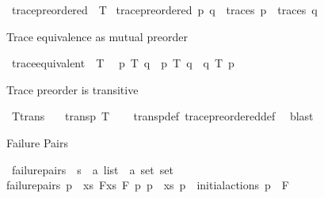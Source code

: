 \begin{isabellebody}
\begin{isamarkuptext}
\end{isamarkuptext}\isamarkuptrue%
\isamarkupfalse%
\ trace{\isacharunderscore}{\kern0pt}preordered\ {\isacharparenleft}{\kern0pt}\ {\isacartoucheopen}{\isasymlesssim}T{\isacartoucheclose}\ {}{}{\isacharparenright}{\kern0pt}\isanewline
{\isacartoucheopen}trace{\isacharunderscore}{\kern0pt}preordered\ p\ q\ {\isasymequiv}\ traces\ p\ {\isasymsubseteq}\ traces\ q{\isacartoucheclose}%
\begin{isamarkuptext}%
Trace equivalence as mutual preorder%
\end{isamarkuptext}\isamarkuptrue%
\isamarkupfalse%
\ trace{\isacharunderscore}{\kern0pt}equivalent\ {\isacharparenleft}{\kern0pt}\ {\isacartoucheopen}{\isasymsimeq}T{\isacartoucheclose}\ {}{}{\isacharparenright}{\kern0pt}\ \isanewline
{\isacartoucheopen}p\ {\isasymsimeq}T\ q\ {\isasymequiv}\ p\ {\isasymlesssim}T\ q\ {\isasymand}\ q\ {\isasymlesssim}T\ p{\isacartoucheclose}%
\begin{isamarkuptext}%
Trace preorder is transitive%
\end{isamarkuptext}\isamarkuptrue%
\isamarkupfalse%
\ T{\isacharunderscore}{\kern0pt}trans{\isacharcolon}{\kern0pt}\isanewline
\ \ \ {\isacartoucheopen}transp\ {\isacharparenleft}{\kern0pt}{\isasymlesssim}T{\isacharparenright}{\kern0pt}{\isacartoucheclose}\isanewline
%
\isadelimproof
\ \ %
\endisadelimproof
%
\isatagproof
{}\isamarkupfalse%
\ transp{\isacharunderscore}{\kern0pt}def\ trace{\isacharunderscore}{\kern0pt}preordered{\isacharunderscore}{\kern0pt}def\ \isamarkupfalse%
\ blast%
\endisatagproof
{\isafoldproof}%
%
\isadelimproof
%
\endisadelimproof
%
\begin{isamarkuptext}%
Failure Pairs%
\end{isamarkuptext}\isamarkuptrue%
\isamarkupfalse%
\ failure{\isacharunderscore}{\kern0pt}pairs\ {\isacharcolon}{\kern0pt}{\isacharcolon}{\kern0pt}\ {\isacartoucheopen}{\isacharprime}{\kern0pt}s\ {\isasymRightarrow}\ {\isacharparenleft}{\kern0pt}{\isacharprime}{\kern0pt}a\ list\ {\isasymtimes}\ {\isacharprime}{\kern0pt}a\ set{\isacharparenright}{\kern0pt}\ set{\isacartoucheclose}\isanewline
\ \ \isanewline
{\isacartoucheopen}failure{\isacharunderscore}{\kern0pt}pairs\ p\ {\isasymequiv}\ {\isacharbraceleft}{\kern0pt}{\isacharparenleft}{\kern0pt}xs{\isacharcomma}{\kern0pt}\ F{\isacharparenright}{\kern0pt}{\isacharbar}{\kern0pt}xs\ F{\isachardot}{\kern0pt}\ {\isasymexists}p{\isacharprime}{\kern0pt}{\isachardot}{\kern0pt}\ p\ {\isasymmapsto}{\isachardollar}{\kern0pt}\ xs\ p{\isacharprime}{\kern0pt}\ {\isasymand}\ {\isacharparenleft}{\kern0pt}initial{\isacharunderscore}{\kern0pt}actions\ p{\isacharprime}{\kern0pt}\ {\isasyminter}\ F\ {\isacharequal}{\kern0pt}\ {\isacharbraceleft}{\kern0pt}{\isacharbraceright}{\kern0pt}{\isacharparenright}{\kern0pt}{\isacharbraceright}{\kern0pt}{\isacartoucheclose}%

\end{isabellebody}
